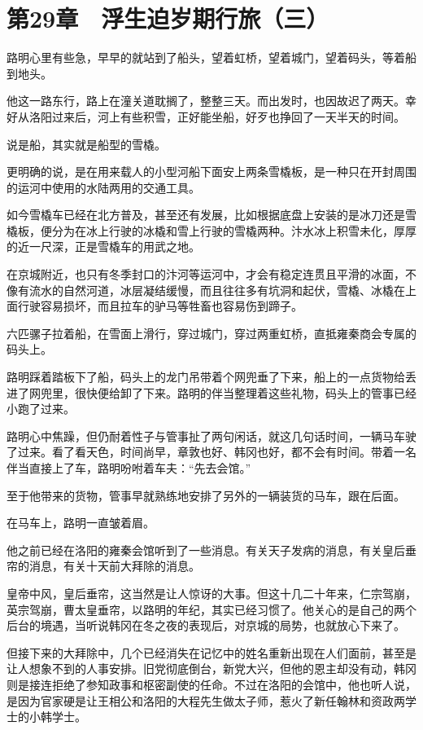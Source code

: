 \section{第29章　浮生迫岁期行旅（三）}

路明心里有些急，早早的就站到了船头，望着虹桥，望着城门，望着码头，等着船到地头。

他这一路东行，路上在潼关道耽搁了，整整三天。而出发时，也因故迟了两天。幸好从洛阳过来后，河上有些积雪，正好能坐船，好歹也挣回了一天半天的时间。

说是船，其实就是船型的雪橇。

更明确的说，是在用来载人的小型河船下面安上两条雪橇板，是一种只在开封周围的运河中使用的水陆两用的交通工具。

如今雪橇车已经在北方普及，甚至还有发展，比如根据底盘上安装的是冰刀还是雪橇板，便分为在冰上行驶的冰橇和雪上行驶的雪橇两种。汴水冰上积雪未化，厚厚的近一尺深，正是雪橇车的用武之地。

在京城附近，也只有冬季封口的汴河等运河中，才会有稳定连贯且平滑的冰面，不像有流水的自然河道，冰层凝结缓慢，而且往往多有坑洞和起伏，雪橇、冰橇在上面行驶容易损坏，而且拉车的驴马等牲畜也容易伤到蹄子。

六匹骡子拉着船，在雪面上滑行，穿过城门，穿过两重虹桥，直抵雍秦商会专属的码头上。

路明踩着踏板下了船，码头上的龙门吊带着个网兜垂了下来，船上的一点货物给丢进了网兜里，很快便给卸了下来。路明的伴当整理着这些礼物，码头上的管事已经小跑了过来。

路明心中焦躁，但仍耐着性子与管事扯了两句闲话，就这几句话时间，一辆马车驶了过来。看了看天色，时间尚早，章敦也好、韩冈也好，都不会有时间。带着一名伴当直接上了车，路明吩咐着车夫：“先去会馆。”

至于他带来的货物，管事早就熟练地安排了另外的一辆装货的马车，跟在后面。

在马车上，路明一直皱着眉。

他之前已经在洛阳的雍秦会馆听到了一些消息。有关天子发病的消息，有关皇后垂帘的消息，有关十天前大拜除的消息。

皇帝中风，皇后垂帘，这当然是让人惊讶的大事。但这十几二十年来，仁宗驾崩，英宗驾崩，曹太皇垂帘，以路明的年纪，其实已经习惯了。他关心的是自己的两个后台的境遇，当听说韩冈在冬之夜的表现后，对京城的局势，也就放心下来了。

但接下来的大拜除中，几个已经消失在记忆中的姓名重新出现在人们面前，甚至是让人想象不到的人事安排。旧党彻底倒台，新党大兴，但他的恩主却没有动，韩冈则是接连拒绝了参知政事和枢密副使的任命。不过在洛阳的会馆中，他也听人说，是因为官家硬是让王相公和洛阳的大程先生做太子师，惹火了新任翰林和资政两学士的小韩学士。

